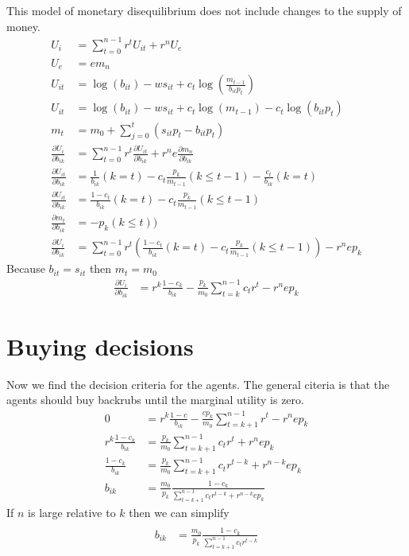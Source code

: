 \documentclass[14pt]{article} \usepackage{amsmath}
\begin{document}
This model of monetary disequilibrium does not include changes to the supply of money.  
\begin{align} 
	U_i &= \sum\limits_{t=0}^{n-1} r^t U_{it} + r^n U_e
	\\U_e &=  e m_n 
	\\U_{it} &= \log(b_{it}) - w s_{it} + c_t \log(\frac{m_{t-1}}{b_{it} p_t})
	\\ U_{it} &= \log(b_{it}) - w s_{it} + c_t \log(m_{t-1}) - c_t \log(b_{it} p_t)
	\\ m_t &= m_0 + \sum\limits_{j=0}^t (s_{it} p_t -b_{it} p_t)
	\\\frac{ \partial U_i}{\partial b_{ik}} &= \sum\limits_{t=0}^{n-1} r^t \frac{\partial U_{it}}{\partial b_{ik}} + r^n e \frac{\partial m_n}{\partial b_{ik}} 
	\\\frac{\partial U_{it}}{\partial b_{ik}} &= \frac{1}{b_{ik}} (k = t)-c_t \frac{p_k}{m_{t-1}} (k \leq t-1) - \frac{c_t}{b_{ik}} (k = t) 
	\\\frac{\partial U_{it}}{\partial b_{ik}} &= \frac{1-c_t}{b_{ik}} (k = t)-c_t\frac{p_k}{m_{t-1}} (k \leq t-1) 
	\\\frac{\partial m_t}{\partial b_{ik}} &= -p_k(k \leq t)) 
	\\\frac{\partial U_i}{\partial b_{ik}} &= \sum\limits_{t=0}^{n-1} r^t(\frac{1-c_t}{b_{ik}} (k = t)-c_t\frac{p_k}{m_{t-1}} (k \leq t-1)) - r^n e p_k 
\end{align}
Because $b_{it} = s_{it}$ then $m_t = m_0$ 
\begin{align}
	\frac{\partial U_i}{\partial b_{ik}} &= r^k\frac{1-c_k}{b_{ik}} - \frac{p_k}{m_0} \sum\limits_{t=k}^{n-1} c_t r^t - r^n e p_k
\end{align}
\section{Buying decisions}
Now we find the decision criteria for the agents. The general citeria is that the agents should buy backrubs until the marginal utility is zero.
\begin{align}
 	0 &= r^k\frac{1-c}{b_{ik}} - \frac{c p_k}{m_0} \sum\limits_{t=k+1}^{n-1} r^t - r^n e p_k 
 	\\r^k\frac{1-c_k}{b_{ik}} &=  \frac{p_k}{m_0} \sum\limits_{t=k+1}^{n-1} c_t r^t + r^n e p_k 
 	\\\frac{1-c_k}{b_{ik}} &=  \frac{p_k}{m_0} \sum\limits_{t=k+1}^{n-1} c_t r^{t-k} + r^{n-k} e p_k 
 	\\b_{ik} &=  \frac{m_0}{p_k} \frac {1-c_k}{\sum\limits_{t=k+1}^{n-1} c_t r^{t-k} + r^{n-k} e p_k} 
\end{align}
If $n$ is large relative to $k$ then we can simplify 
\begin{align}
 	\\b_{ik} &=  \frac{m_0}{p_k} \frac {1-c_k}{\sum\limits_{t=k+1}^{n-1} c_t r^{t-k}} 
\end{align}
\end{document}
